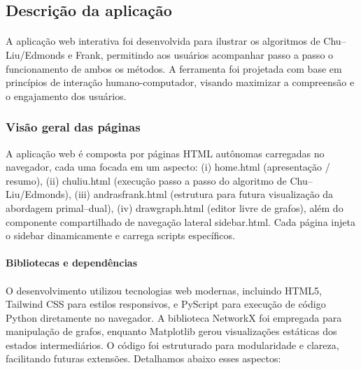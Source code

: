 \documentclass[12pt,a4paper]{article}
\def\texttt#1{#1}%
\def\_{}%
\begin{document}
\subsection{Descrição da aplicação}
\paragraph{}
A aplicação web interativa foi desenvolvida para ilustrar os algoritmos de Chu–Liu/Edmonds e Frank, permitindo aos usuários acompanhar passo a passo o funcionamento de ambos os métodos. A ferramenta foi projetada com base em princípios de interação humano-computador, visando maximizar a compreensão e o engajamento dos usuários.


\subsubsection{Visão geral das páginas}
A aplicação web é composta por páginas HTML autônomas carregadas no navegador, cada uma focada em um aspecto: (i) \texttt{home.html} (apresentação / resumo), (ii) \texttt{chuliu.html} (execução passo a passo do algoritmo de Chu--Liu/Edmonds), (iii) \texttt{andrasfrank.html} (estrutura para futura visualização da abordagem primal--dual), (iv) \texttt{draw\_graph.html} (editor livre de grafos), além do componente compartilhado de navegação lateral \texttt{sidebar.html}. Cada página injeta o \texttt{sidebar} dinamicamente e carrega scripts específicos.

\paragraph{Bibliotecas e dependências}

\paragraph{}
O desenvolvimento utilizou tecnologias web modernas, incluindo HTML5, Tailwind CSS para estilos responsivos, e PyScript para execução de código Python diretamente no navegador. A biblioteca NetworkX foi empregada para manipulação de grafos, enquanto Matplotlib gerou visualizações estáticas dos estados intermediários. O código foi estruturado para modularidade e clareza, facilitando futuras extensões. Detalhamos abaixo esses aspectos:
\end{document}
